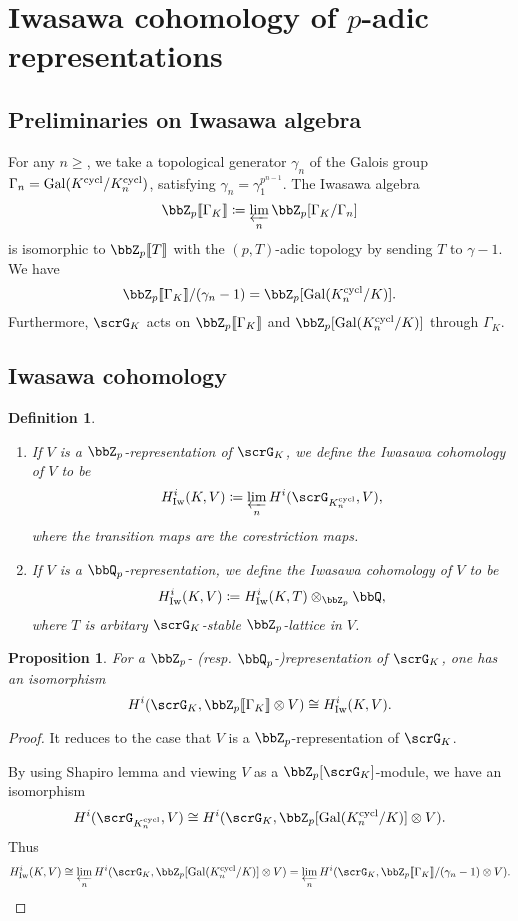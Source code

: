 \documentclass[a4paper,oneside]{amsart}
\newtheorem{proposition}[theorem]{Proposition}
\newtheorem{definition}[theorem]{Definition}
\numberwithin{equation}{section}
\numberwithin{figure}{section}
\begin{document}
\section{Iwasawa cohomology of $p$-adic representations}
\subsection{Preliminaries on Iwasawa algebra}
For any $n\geq $, we take a topological generator $\gamma_n$ of the Galois group $\Gamma_n=\operatorname{Gal}(K^{\operatorname{cycl}}/K_n^{\operatorname{cycl}})$, satisfying $\gamma_n=\gamma_1^{p^{n-1}}$. The Iwasawa algebra
$$\bbZ_p\llbracket\Gamma_K\rrbracket\coloneqq \varprojlim_n \bbZ_p[\Gamma_K/\Gamma_n]$$
is isomorphic to $\bbZ_p\llbracket T\rrbracket$ with the $(p,T)$-adic topology by sending $T$ to $\gamma-1$. We have
$$\bbZ_p\llbracket \Gamma_K\rrbracket/(\gamma_n-1)=\bbZ_p[\opn{Gal}(K_n^{\opn{cycl}}/K)].$$
Furthermore, $\scrG_K$ acts on $\bbZ_p\llbracket\Gamma_K\rrbracket$ and $\bbZ_p[\opn{Gal}(K_n^{\opn{cycl}}/K)]$ through $\Gamma_K$.


\subsection{Iwasawa cohomology}
\begin{definition}\leavevmode
    \begin{enumerate}
        \item If $V$ is a $\bbZ_p$-representation of $\scrG_K$, we define the Iwasawa cohomology of $V$ to be
              $$H^i_{\opn{Iw}}(K,V)\coloneqq \varprojlim_n H^i(\scrG_{K_n^{\opn{cycl}}},V),$$
              where the transition maps are the corestriction maps.
        \item If $V$ is a $\bbQ_p$-representation, we define the Iwasawa cohomology of $V$ to be
              $$H^i_{\opn{Iw}}(K,V)\coloneqq H^i_{\opn{Iw}}(K,T)\otimes_{\bbZ_p} \bbQ,$$
              where $T$ is arbitary $\scrG_K$-stable $\bbZ_p$-lattice in $V$.
    \end{enumerate}
\end{definition}

\begin{proposition}
    For a $\bbZ_p$- (resp. $\bbQ_p$-)representation of $\scrG_K$, one has an isomorphism
    $$H^i(\scrG_K,\bbZ_p\llbracket \Gamma_K\rrbracket\otimes V)\cong H^i_{\opn{Iw}}(K,V).$$
\end{proposition}
\begin{proof}
    It reduces to the case that $V$ is a $\bbZ_p$-representation of $\scrG_K$.

    By using Shapiro lemma and viewing $V$ as a $\bbZ_p[\scrG_K]$-module, we have an isomorphism
    $$H^i(\scrG_{K_n^{\opn{cycl}}},V)\cong H^i(\scrG_K,\bbZ_p[\opn{Gal}(K_n^{\opn{cycl}}/K)]\otimes V).$$
    Thus
    $$H^i_{\opn{Iw}}(K,V)\cong\varprojlim_n H^i(\scrG_K,\bbZ_p[\opn{Gal}(K_n^{\opn{cycl}}/K)]\otimes V)=\varprojlim_n H^i(\scrG_K,\bbZ_p\llbracket\Gamma_K\rrbracket/(\gamma_n-1)\otimes V).$$
\end{proof}
\end{document}
